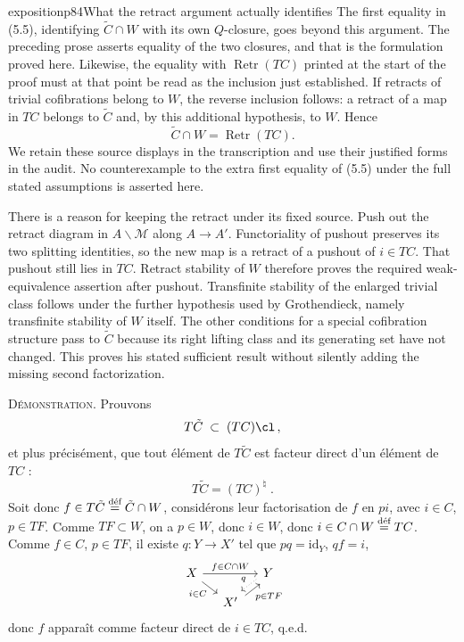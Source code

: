 \begin{dcomment}{exposition}{p84}{What the retract argument actually identifies}
The first equality in (5.5), identifying $\widetilde C\cap W$ with its own $Q$-closure, goes beyond this argument. The preceding prose asserts equality of the two closures, and that is the formulation proved here. Likewise, the equality with $\operatorname{Retr}(TC)$ printed at the start of the proof must at that point be read as the inclusion just established. If retracts of trivial cofibrations belong to $W$, the reverse inclusion follows: a retract of a map in $TC$ belongs to $\widetilde C$ and, by this additional hypothesis, to $W$. Hence
\[
 \widetilde C\cap W=\operatorname{Retr}(TC).
\]
We retain these source displays in the transcription and use their justified forms in the audit. No counterexample to the extra first equality of (5.5) under the full stated assumptions is asserted here.

There is a reason for keeping the retract under its fixed source. Push out the retract diagram in $A\backslash\mathcal M$ along $A\to A'$. Functoriality of pushout preserves its two splitting identities, so the new map is a retract of a pushout of $i\in TC$. That pushout still lies in $TC$. Retract stability of $W$ therefore proves the required weak-equivalence assertion after pushout. Transfinite stability of the enlarged trivial class follows under the further hypothesis used by Grothendieck, namely transfinite stability of $W$ itself. The other conditions for a special cofibration structure pass to $\widetilde C$ because its right lifting class and its generating set have not changed. This proves his stated sufficient result without silently adding the missing second factorization.
\end{dcomment}


\textsc{Démonstration}. Prouvons
\[
T\tilde{C} \;\subset\; (TC)\cl \, ,
\]
et plus précisément, que tout élément de $T\tilde{C}$ est facteur direct d'un élément de $TC$ :
\[
T\tilde{C} = (TC)^{\natural} \; .
\]
Soit donc $f \in T\tilde{C} \defeq \tilde{C}\cap W$, considérons leur factorisation de $f$ en $pi$, avec $i \in C$, $p \in TF$. Comme $TF \subset W$, on a $p \in W$, donc $i \in W$, donc $i \in C \cap W \defeq TC$. Comme $f \in C$, $p \in TF$, il existe $q : Y \longrightarrow X'$ tel que $pq = \mathrm{id}_Y$, $qf = i$,
\[
\begin{tikzcd}[column sep=small, row sep=small]
X \arrow[rr, "f\in C\cap W"] \arrow[dr, "i\in C"'] & & Y \arrow[dl, dotted, shift right, "q"'] \\
& X' \arrow[ur, shift right, "p\in TF"'] &
\end{tikzcd}
\]
donc $f$ apparaît comme facteur direct de $i \in TC$, q.e.d.

